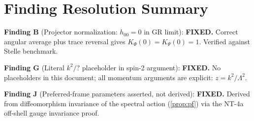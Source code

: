 \documentclass[11pt,a4paper]{article}
\theoremstyle{plain}
\theoremstyle{definition}
\theoremstyle{remark}
\begin{document}
\section{Finding Resolution Summary}\label{sec:findings}

\noindent\textbf{Finding B} (Projector normalization: $h_{00} = 0$ in
GR limit): \textbf{FIXED.}  Correct angular average plus trace reversal
gives $K_\Phi(0) = K_\Psi(0) = 1$.  Verified against Stelle benchmark.

\medskip\noindent\textbf{Finding G} (Literal $k^2/?$ placeholder in
spin-2 argument): \textbf{FIXED.}  No placeholders in this document;
all momentum arguments are explicit: $z = k^2/\Lambda^2$.

\medskip\noindent\textbf{Finding J} (Preferred-frame parameters
asserted, not derived): \textbf{FIXED.}  Derived from diffeomorphism
invariance of the spectral action (\cref{prop:pf}) via the NT-4a
off-shell gauge invariance proof.
\end{document}
